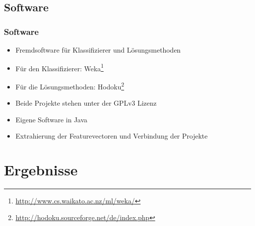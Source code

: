 \documentclass[accentcolor=tud6b,colorbacktitle,inverttitle,landscape,german,presentation,t]{tudbeamer}
\begin{document}
	\subsection{Software}
		\begin{frame}
		\frametitle{Software}
		\begin{itemize}
		\item Fremdsoftware für Klassifizierer und Lösungsmethoden
		\item Für den Klassifizierer: Weka\footnote{\url{http://www.cs.waikato.ac.nz/ml/weka/}}
		\item Für die Lösungsmethoden: Hodoku\footnote{\url{http://hodoku.sourceforge.net/de/index.php}}
		\item Beide Projekte stehen unter der GPLv3 Lizenz
		\item Eigene Software in Java
		\item Extrahierung der Featurevectoren und Verbindung der Projekte
		\end{itemize}
		\end{frame}

\section{Ergebnisse}
\end{document}
